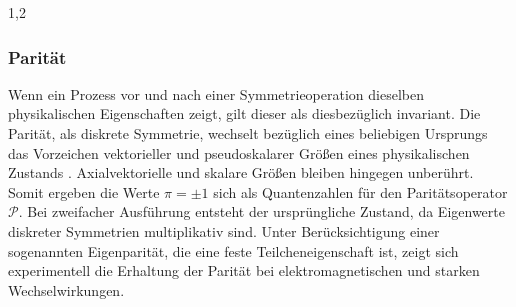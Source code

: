 \documentclass[11pt,a4paper,twoside]{report}
\begin{document}
\begin{spacing}{1,2}
\subsubsection{Parität}
\label{sec_parity}
Wenn ein Prozess vor und nach einer Symmetrieoperation dieselben physikalischen Eigenschaften zeigt, gilt dieser als diesbezüglich invariant. Die Parität, als diskrete Symmetrie, wechselt bezüglich 
eines beliebigen Ursprungs das Vorzeichen vektorieller und pseudoskalarer Größen eines physikalischen Zustands \cite{Klapdor}. Axialvektorielle und skalare Größen bleiben
hingegen unberührt. Somit ergeben die Werte $\pi = \pm1$ sich als Quantenzahlen für den Paritätsoperator $\mathcal{P}$. Bei zweifacher Ausführung entsteht 
der ursprüngliche Zustand, da Eigenwerte diskreter Symmetrien multiplikativ sind. Unter Berücksichtigung einer sogenannten Eigenparität, die eine feste
Teilcheneigenschaft ist, zeigt sich experimentell die Erhaltung der Parität bei elektromagnetischen und starken Wechselwirkungen.


\end{spacing}
\end{document}
